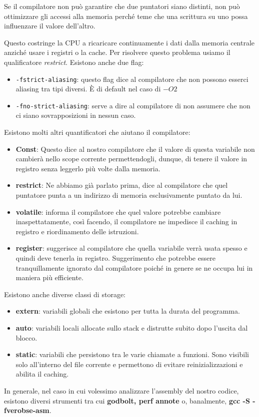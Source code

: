 Se il compilatore non può garantire che due puntatori siano distinti, non può ottimizzare gli accessi alla memoria perché teme che una scrittura su uno possa influenzare il valore dell'altro. 

Questo costringe la CPU a ricaricare continuamente i dati dalla memoria centrale anziché usare i registri o la cache. Per risolvere questo problema usiamo il qualificatore \textit{restrict}.
Esistono anche due flag:
\begin{itemize}
    \item \texttt{-fstrict-aliasing}: questo flag dice al compilatore che non possono esserci aliasing tra tipi diversi. È di default nel caso di $-O2$
    \item \texttt{-fno-strict-aliasing}: serve a dire al compilatore di non assumere che non ci siano sovrapposizioni in nessun caso.
\end{itemize}

Esistono molti altri quantificatori che aiutano il compilatore:
\begin{itemize}
    \item \textbf{Const}: Questo dice al nostro compilatore che il valore di questa variabile non cambierà nello scope corrente permettendogli, dunque, di tenere il valore in registro senza leggerlo più volte dalla memoria. 
    \item \textbf{restrict}: Ne abbiamo già parlato prima, dice al compilatore che quel puntatore punta a un indirizzo di memoria esclusivamente puntato da lui.
    \item \textbf{volatile}: informa il compilatore che quel valore potrebbe cambiare inaspettatamente, così facendo, il compilatore ne impedisce il caching in registro e riordinamento delle istruzioni.
    \item \textbf{register}: suggerisce al compilatore che quella variabile verrà usata spesso e quindi deve tenerla in registro. Suggerimento che potrebbe essere tranquillamente ignorato dal compilatore poiché in genere se ne occupa lui in maniera più efficiente.
\end{itemize}
Esistono anche diverse classi di storage:
\begin{itemize}
    \item \textbf{extern}: variabili globali che esistono per tutta la durata del programma.
    \item \textbf{auto}: variabili locali allocate sullo stack e distrutte subito dopo l'uscita dal blocco.
    \item \textbf{static}: variabili che persistono tra le varie chiamate a funzioni. Sono visibili solo all'interno del file corrente e permettono di evitare reinizializzazioni e abilita il caching.
\end{itemize}
In generale, nel caso in cui volessimo analizzare l'assembly del nostro codice, esistono diversi strumenti tra cui \textbf{godbolt, perf annote} o, banalmente, \textbf{gcc -S -fverobse-asm}.

